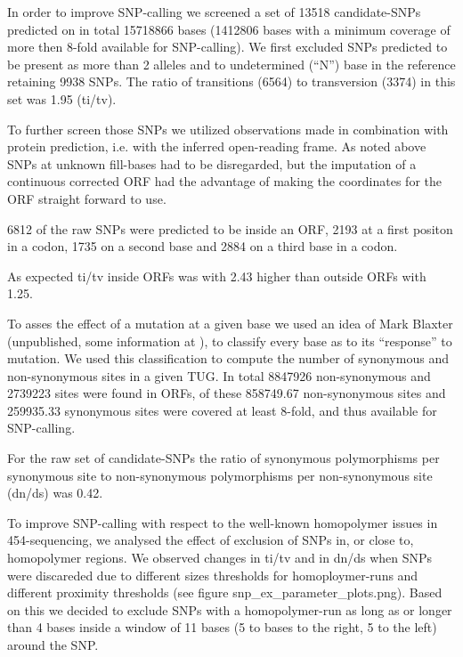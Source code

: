 \documentclass[10pt]{bmc_article}
\newenvironment{bmcformat}{\begin{raggedright}\baselineskip20pt\sloppy\setboolean{publ}{false}}{\end{raggedright}\baselineskip20pt\sloppy}
\begin{document}
\begin{bmcformat}





In order to improve SNP-calling we screened a set of 13518
candidate-SNPs predicted on in total 15718866 bases
(1412806 bases with a minimum coverage of more then 8-fold
available for SNP-calling). We first excluded SNPs predicted to be
present as more than 2 alleles and to undetermined (``N'') base in the
reference retaining 9938 SNPs. The ratio of transitions
(6564) to transversion (3374) in
this set was 1.95 (ti/tv).

To further screen those SNPs we utilized observations made in
combination with protein prediction, i.e. with the inferred
open-reading frame. As noted above SNPs at unknown fill-bases had to
be disregarded, but the imputation of a continuous corrected ORF had
the advantage of making the coordinates for the ORF straight forward
to use.

6812 of the raw SNPs were predicted to be inside
an ORF, 2193 at a first positon in a codon,
1735 on a second base and
2884 on a third base in a codon.

As expected ti/tv inside ORFs was with
2.43 higher than outside ORFs
with 1.25.

To asses the effect of a mutation at a given base we used an idea of
Mark Blaxter (unpublished, some information at \cite{Marks_ontology}),
to classify every base as to its ``response'' to mutation. We used
this classification to compute the number of synonymous and
non-synonymous sites in a given TUG. In total 8847926
non-synonymous and 2739223 sites were found in ORFs, of
these 858749.67 non-synonymous sites and
259935.33 synonymous sites were covered at
least 8-fold, and thus available for SNP-calling.

For the raw set of candidate-SNPs the ratio of synonymous
polymorphisms per synonymous site to non-synonymous polymorphisms per
non-synonymous site (dn/ds) was 0.42.

To improve SNP-calling with respect to the well-known homopolymer
issues in 454-sequencing\cite{pmid21685085}, we analysed the effect of
exclusion of SNPs in, or close to, homopolymer regions. We observed
changes in ti/tv and in dn/ds when SNPs were discareded due to
different sizes thresholds for homoploymer-runs and different
proximity thresholds (see figure snp\_ex\_parameter\_plots.png). Based
on this we decided to exclude SNPs with a homopolymer-run as long as
or longer than 4 bases inside a window of 11 bases (5 to bases to the
right, 5 to the left) around the SNP.


\end{bmcformat}
\end{document}
